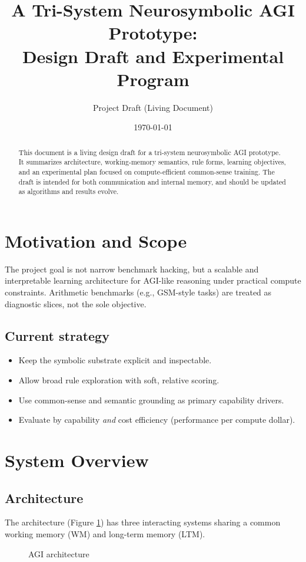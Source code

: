 \documentclass[14pt]{article}
\title{A Tri-System Neurosymbolic AGI Prototype:\\Design Draft and Experimental Program}
\author{Project Draft (Living Document)}
\date{\today}
\begin{document}
\maketitle

\begin{abstract}
This document is a living design draft for a tri-system neurosymbolic AGI prototype.
It summarizes architecture, working-memory semantics, rule forms, learning objectives,
and an experimental plan focused on compute-efficient common-sense training.
The draft is intended for both communication and internal memory, and should be updated
as algorithms and results evolve.
\end{abstract}

\section{Motivation and Scope}
The project goal is not narrow benchmark hacking, but a scalable and interpretable learning architecture
for AGI-like reasoning under practical compute constraints.
Arithmetic benchmarks (e.g., GSM-style tasks) are treated as diagnostic slices, not the sole objective.

\subsection{Current strategy}
\begin{itemize}[leftmargin=1.5em]
  \item Keep the symbolic substrate explicit and inspectable.
  \item Allow broad rule exploration with soft, relative scoring.
  \item Use common-sense and semantic grounding as primary capability drivers.
  \item Evaluate by capability \emph{and} cost efficiency (performance per compute dollar).
\end{itemize}

\section{System Overview}

\subsection{Architecture}
The architecture (Figure \ref{fig:architecture}) has three interacting systems sharing a common working memory (WM) and long-term memory (LTM).
\begin{figure}[h]
	\centering
	
	\caption{AGI architecture}
	\label{fig:architecture}
\end{figure}
\end{document}
